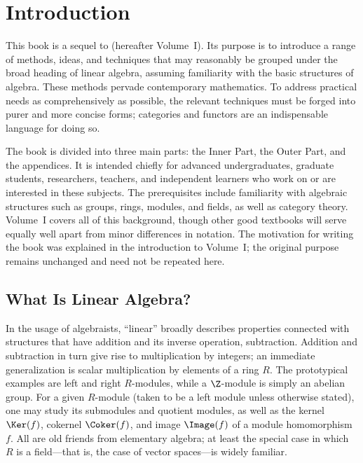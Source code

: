 
\chapter*{Introduction}
\hypertarget{o014.aljabr2.prelude}{ }

This book is a sequel to \cite{Li1} (hereafter Volume~I). Its purpose is to introduce a range of methods, ideas, and techniques that may reasonably be grouped under the broad heading of linear algebra, assuming familiarity with the basic structures of algebra. These methods pervade contemporary mathematics. To address practical needs as comprehensively as possible, the relevant techniques must be forged into purer and more concise forms; categories and functors are an indispensable language for doing so.

The book is divided into three main parts: the Inner Part, the Outer Part, and the appendices. It is intended chiefly for advanced undergraduates, graduate students, researchers, teachers, and independent learners who work on or are interested in these subjects. The prerequisites include familiarity with algebraic structures such as groups, rings, modules, and fields, as well as category theory. Volume~I covers all of this background, though other good textbooks will serve equally well apart from minor differences in notation. The motivation for writing the book was explained in the introduction to Volume~I; the original purpose remains unchanged and need not be repeated here.

\section*{What Is Linear Algebra?}
\hypertarget{o014.aljabr2.prelude.linear-algebra}{ }

In the usage of algebraists, ``linear'' broadly describes properties connected with structures that have addition and its inverse operation, subtraction. Addition and subtraction in turn give rise to multiplication by integers; an immediate generalization is scalar multiplication by elements of a ring $R$. The prototypical examples are left and right $R$-modules, while a $\Z$-module is simply an abelian group. For a given $R$-module (taken to be a left module unless otherwise stated), one may study its submodules and quotient modules, as well as the kernel $\Ker(f)$, cokernel $\Coker(f)$, and image $\Image(f)$ of a module homomorphism $f$. All are old friends from elementary algebra; at least the special case in which $R$ is a field---that is, the case of vector spaces---is widely familiar.

